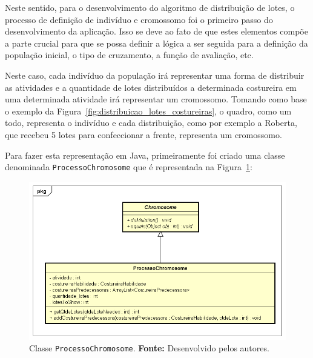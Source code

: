 \par Neste sentido, para o desenvolvimento do algoritmo de distribuição de
lotes, o processo de definição de indivíduo e cromossomo foi o primeiro passo do desenvolvimento da aplicação. Isso se
deve ao fato de que estes elementos compõe a parte crucial para que se
possa definir a lógica a ser seguida para a definição da população inicial, o
tipo de cruzamento, a função de avaliação, etc.

\par Neste caso, cada indivíduo da população irá representar uma forma de
distribuir as atividades e a quantidade de lotes distribuídos a determinada
costureira em uma determinada atividade irá representar um cromossomo. 
Tomando como base o exemplo da Figura~\ref{fig:distribuicao_lotes_costureiras},
o quadro, como um todo, representa o indivíduo e cada distribuição, como por exemplo a Roberta, que recebeu 5 
lotes para confeccionar a frente, representa um cromossomo.

\par Para fazer esta representação em Java, primeiramente foi criado uma classe denominada \texttt{ProcessoChromosome} que é
representada na Figura~\ref{fig:class_processoChromosome}:

\begin{figure}[h!]
	\centerline{\includegraphics[scale=0.5]{./imagens/processo_chromosome_diagram.png}}
	\caption[Classe \texttt{ProcessoChromosome}.]
	{Classe \texttt{ProcessoChromosome}. \textbf{Fonte:} Desenvolvido pelos
	autores.}
	\label{fig:class_processoChromosome}
\end{figure}


